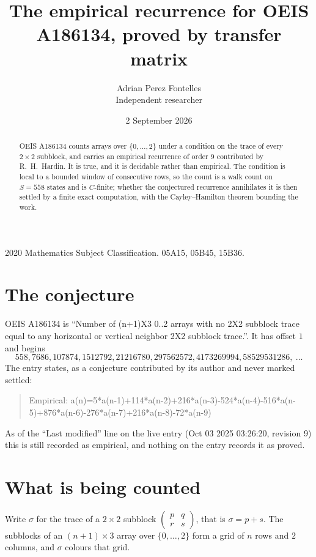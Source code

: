 \documentclass[11pt,a4paper]{article}
\title{The empirical recurrence for OEIS A186134, proved by transfer matrix}
\author{Adrian Perez Fontelles\\ \small Independent researcher}
\date{2 September 2026}
\theoremstyle{plain}
\theoremstyle{definition}
\begin{document}
\maketitle

\begin{abstract}
OEIS A186134 counts arrays over $\{0,\dots,2\}$ under a condition on the trace of every
$2\times2$ subblock, and carries an empirical recurrence of order $9$ contributed by
R.~H.~Hardin. It is true, and it is decidable rather than empirical. The condition is local to
a bounded window of consecutive rows, so the count is a walk count on $S=558$ states and is
$C$-finite; whether the conjectured recurrence annihilates it is then settled by a finite exact
computation, with the Cayley--Hamilton theorem bounding the work.
\end{abstract}

\noindent\small 2020 Mathematics Subject Classification. 05A15, 05B45, 15B36.\normalsize

\section{The conjecture}

OEIS A186134 is ``Number of (n+1)X3 0..2 arrays with no 2X2 subblock trace equal to any horizontal or vertical neighbor 2X2 subblock trace.''. It has offset $1$ and begins
\[
558, 7686, 107874, 1512792, 21216780, 297562572, 4173269994, 58529531286,\ \dots
\]
The entry states, as a conjecture contributed by its author and never marked settled:
\begin{quote}
Empirical: a(n)=5*a(n-1)+114*a(n-2)+216*a(n-3)-524*a(n-4)-516*a(n-5)+876*a(n-6)-276*a(n-7)+216*a(n-8)-72*a(n-9)
\end{quote}
As of the ``Last modified'' line on the live entry (Oct 03 2025 03:26:20, revision 9) this is still
recorded as empirical, and nothing on the entry records it as proved.

\section{What is being counted}

Write $\sigma$ for the trace of a $2\times2$ subblock
$\begin{pmatrix}p&q\\r&s\end{pmatrix}$, that is $\sigma=p+s$. The subblocks of an
$(n+1)\times3$ array over $\{0,\dots,2\}$ form a grid of $n$ rows and $2$
columns, and $\sigma$ colours that grid.
\end{document}
